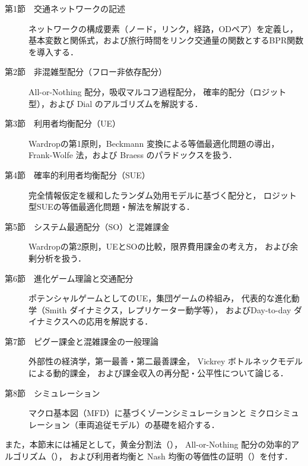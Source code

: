 \begin{description}
  \item[第1節　交通ネットワークの記述]
    ネットワークの構成要素（ノード，リンク，経路，ODペア）を定義し，
    基本変数と関係式，および旅行時間をリンク交通量の関数とするBPR関数を導入する．

  \item[第2節　非混雑型配分（フロー非依存配分）]
    All-or-Nothing 配分，吸収マルコフ過程配分，
    確率的配分（ロジット型），および Dial のアルゴリズムを解説する\cite{Dial1971}．

  \item[第3節　利用者均衡配分（UE）]
    Wardropの第1原則，Beckmann 変換による等価最適化問題の導出，
    Frank-Wolfe 法，および Braess のパラドックスを扱う\cite{Beckmann1956,FrankWolfe1956,Wardrop1952}．

  \item[第4節　確率的利用者均衡配分（SUE）]
    完全情報仮定を緩和したランダム効用モデルに基づく配分と，
    ロジット型SUEの等価最適化問題・解法を解説する\cite{Fisk1980,McFadden1974}．

  \item[第5節　システム最適配分（SO）と混雑課金]
    Wardropの第2原則，UEとSOの比較，限界費用課金の考え方，
    および余剰分析を扱う\cite{Pigou1920}．

  \item[第6節　進化ゲーム理論と交通配分]
    ポテンシャルゲームとしてのUE，集団ゲームの枠組み，
    代表的な進化動学（Smith ダイナミクス，レプリケーター動学等），
    およびDay-to-day ダイナミクスへの応用を解説する\cite{Sandholm2001,Sandholm2010}．

  \item[第7節　ピグー課金と混雑課金の一般理論]
    外部性の経済学，第一最善・第二最善課金，
    Vickrey ボトルネックモデルによる動的課金，
    および課金収入の再分配・公平性について論じる\cite{Vickrey1969}．

  \item[第8節　シミュレーション]
    マクロ基本図（MFD）に基づくゾーンシミュレーションと
    ミクロシミュレーション（車両追従モデル）の基礎を紹介する\cite{Daganzo2007,Geroliminis2008,Gazis1961}．
\end{description}

また，本節末には補足として，黄金分割法（），
All-or-Nothing 配分の効率的アルゴリズム（），
および利用者均衡と Nash 均衡の等価性の証明（）を付す\cite{Nash1950,Nash1951}．
